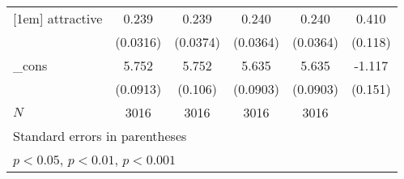 {\begin{tabular}{l*{5}{c}}
[1em]
attractive  &       0.239\sym{***}&       0.239\sym{***}&       0.240\sym{***}&       0.240\sym{***}&       0.410\sym{***}\\
            &    (0.0316)         &    (0.0374)         &    (0.0364)         &    (0.0364)         &     (0.118)         \\
[1em]
\_cons      &       5.752\sym{***}&       5.752\sym{***}&       5.635\sym{***}&       5.635\sym{***}&      -1.117\sym{***}\\
            &    (0.0913)         &     (0.106)         &    (0.0903)         &    (0.0903)         &     (0.151)         \\
\hline
\(N\)       &        3016         &        3016         &        3016         &        3016         &                     \\
\hline\hline
\multicolumn{6}{l}{\footnotesize Standard errors in parentheses}\\
\multicolumn{6}{l}{\footnotesize \sym{*} \(p<0.05\), \sym{**} \(p<0.01\), \sym{***} \(p<0.001\)}\\
\end{tabular}
}
